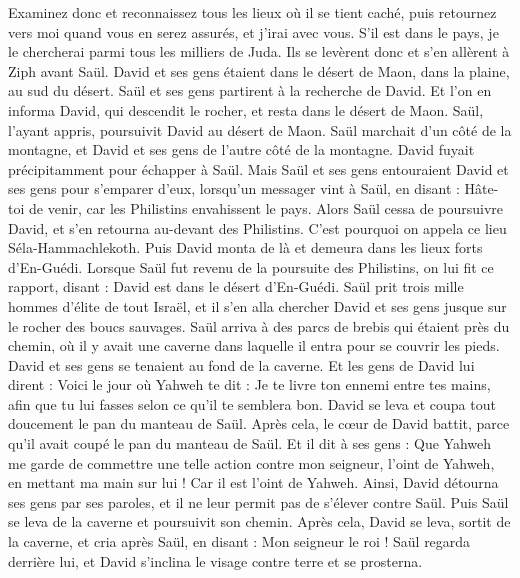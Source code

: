 \begin{multicols}{2}
Examinez donc et reconnaissez tous les lieux où il se tient caché, puis retournez vers moi quand vous en serez assurés, et j'irai avec vous. S'il est dans le pays, je le chercherai parmi tous les milliers de Juda.
Ils se levèrent donc et s'en allèrent à Ziph avant Saül. David et ses gens étaient dans le désert de Maon, dans la plaine, au sud du désert.
Saül et ses gens partirent à la recherche de David. Et l'on en informa David, qui descendit le rocher, et resta dans le désert de Maon. Saül, l'ayant appris, poursuivit David au désert de Maon.
Saül marchait d'un côté de la montagne, et David et ses gens de l'autre côté de la montagne. David fuyait précipitamment pour échapper à Saül. Mais Saül et ses gens entouraient David et ses gens pour s'emparer d'eux,
lorsqu'un messager vint à Saül, en disant : Hâte-toi de venir, car les Philistins envahissent le pays.
Alors Saül cessa de poursuivre David, et s'en retourna au-devant des Philistins. C'est pourquoi on appela ce lieu Séla-Hammachlekoth.
\VerseOne{}Puis David monta de là et demeura dans les lieux forts d'En-Guédi.
Lorsque Saül fut revenu de la poursuite des Philistins, on lui fit ce rapport, disant : David est dans le désert d'En-Guédi.
Saül prit trois mille hommes d'élite de tout Israël, et il s'en alla chercher David et ses gens jusque sur le rocher des boucs sauvages.
Saül arriva à des parcs de brebis qui étaient près du chemin, où il y avait une caverne dans laquelle il entra pour se couvrir les pieds. David et ses gens se tenaient au fond de la caverne.
Et les gens de David lui dirent : Voici le jour où Yahweh te dit : Je te livre ton ennemi entre tes mains, afin que tu lui fasses selon ce qu'il te semblera bon. David se leva et coupa tout doucement le pan du manteau de Saül.
Après cela, le cœur de David battit, parce qu'il avait coupé le pan du manteau de Saül.
Et il dit à ses gens : Que Yahweh me garde de commettre une telle action contre mon seigneur, l'oint de Yahweh, en mettant ma main sur lui ! Car il est l'oint de Yahweh.
Ainsi, David détourna ses gens par ses paroles, et il ne leur permit pas de s'élever contre Saül. Puis Saül se leva de la caverne et poursuivit son chemin.
Après cela, David se leva, sortit de la caverne, et cria après Saül, en disant : Mon seigneur le roi ! Saül regarda derrière lui, et David s'inclina le visage contre terre et se prosterna.

\end{multicols}
